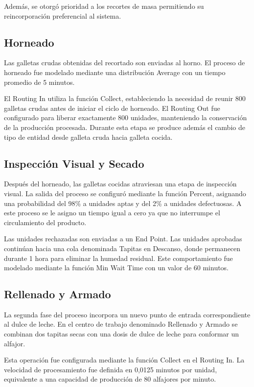 \documentclass[runningheads]{llncs}
\begin{document}
Además, se otorgó prioridad a los recortes de masa permitiendo su reincorporación preferencial al sistema.

\subsection{Horneado}

Las galletas crudas obtenidas del recortado son enviadas al horno. El proceso de horneado fue modelado mediante una distribución Average con un tiempo promedio de 5 minutos.

El Routing In utiliza la función Collect, estableciendo la necesidad de reunir 800 galletas crudas antes de iniciar el ciclo de horneado. El Routing Out fue configurado para liberar exactamente 800 unidades, manteniendo la conservación de la producción procesada. Durante esta etapa se produce además el cambio de tipo de entidad desde galleta cruda hacia galleta cocida.

\subsection{Inspección Visual y Secado}

Después del horneado, las galletas cocidas atraviesan una etapa de inspección visual. La salida del proceso se configuró mediante la función Percent, asignando una probabilidad del 98\% a unidades aptas y del 2\% a unidades defectuosas. A este proceso se le asigno un tiempo igual a cero ya que no interrumpe el circulamiento del producto. 

Las unidades rechazadas son enviadas a un End Point. Las unidades aprobadas continúan hacia una cola denominada Tapitas en Descanso, donde permanecen durante 1 hora para eliminar la humedad residual. Este comportamiento fue modelado mediante la función Min Wait Time con un valor de 60 minutos.

\subsection{Rellenado y Armado}

La segunda fase del proceso incorpora un nuevo punto de entrada correspondiente al dulce de leche. En el centro de trabajo denominado Rellenado y Armado se combinan dos tapitas secas con una dosis de dulce de leche para conformar un alfajor.

Esta operación fue configurada mediante la función Collect en el Routing In. La velocidad de procesamiento fue definida en 0,0125 minutos por unidad, equivalente a una capacidad de producción de 80 alfajores por minuto.
\end{document}
